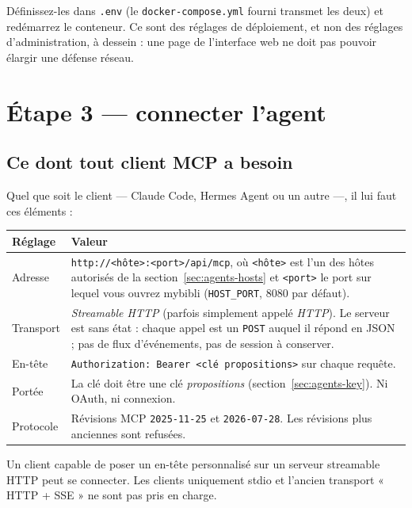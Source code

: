Définissez-les dans \texttt{.env} (le \texttt{docker-compose.yml}
fourni transmet les deux) et redémarrez le conteneur. Ce sont des
réglages de déploiement, et non des réglages d'administration, à
dessein : une page de l'interface web ne doit pas pouvoir élargir une
défense réseau.

\section{Étape 3 --- connecter l'agent}
\label{sec:agents-connect}

\subsection{Ce dont tout client MCP a besoin}
\label{sec:agents-connection-facts}

Quel que soit le client --- Claude Code, Hermes Agent ou un autre ---,
il lui faut ces éléments :

\begin{center}\small
\begin{tabular}{@{} l >{\raggedright\arraybackslash}p{9.5cm} @{}}
\toprule
\textbf{Réglage} & \textbf{Valeur} \\
\midrule
Adresse   & \texttt{http://<hôte>:<port>/api/mcp}, où \texttt{<hôte>}
            est l'un des hôtes autorisés de la
            section~\ref{sec:agents-hosts} et \texttt{<port>} le port
            sur lequel vous ouvrez mybibli (\texttt{HOST\_PORT}, 8080
            par défaut). \\
Transport & \emph{Streamable HTTP} (parfois simplement appelé
            \emph{HTTP}). Le serveur est sans état : chaque appel est
            un \texttt{POST} auquel il répond en JSON ; pas de flux
            d'événements, pas de session à conserver. \\
En-tête   & \texttt{Authorization: Bearer <clé propositions>} sur
            chaque requête. \\
Portée    & La clé doit être une clé \emph{propositions}
            (section~\ref{sec:agents-key}). Ni OAuth, ni connexion. \\
Protocole & Révisions MCP \texttt{2025-11-25} et
            \texttt{2026-07-28}. Les révisions plus anciennes sont
            refusées. \\
\bottomrule
\end{tabular}
\end{center}

Un client capable de poser un en-tête personnalisé sur un serveur
streamable HTTP peut se connecter. Les clients uniquement stdio et
l'ancien transport « HTTP + SSE » ne sont pas pris en charge.

